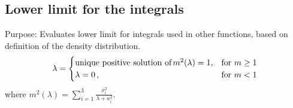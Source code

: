 \documentclass[a4paper,11pt]{article}
\begin{document}
		\subsection{Lower limit for the integrals}
			Purpose: Evaluates lower limit for integrals used in other functions, based on definition of the density distribution.
		\begin{equation*}
		\lambda = \begin{cases}
		\text{unique positive solution of} \, m^2(\lambda)=1, &  \text{for}\ m \geq 1\\
		\lambda = 0\,, & \text{for}\ m < 1
		\end{cases} \\
		\end{equation*}
		where $ m^2(\lambda) = \sum_{i=1}^{3} \frac{x_i^2}{\lambda + a_i^2} $.

			
	
\end{document}
